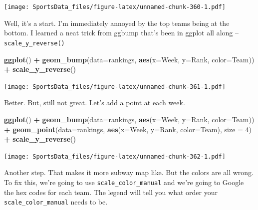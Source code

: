 \documentclass[
]{book}
\newenvironment{Shaded}{\begin{snugshade}}{\end{snugshade}}
\newcommand{\DataTypeTok}[1]{\textcolor[rgb]{0.13,0.29,0.53}{#1}}
\newcommand{\DecValTok}[1]{\textcolor[rgb]{0.00,0.00,0.81}{#1}}
\newcommand{\KeywordTok}[1]{\textcolor[rgb]{0.13,0.29,0.53}{\textbf{#1}}}
\newcommand{\NormalTok}[1]{#1}
\newcommand{\OperatorTok}[1]{\textcolor[rgb]{0.81,0.36,0.00}{\textbf{#1}}}
\newcommand{\StringTok}[1]{\textcolor[rgb]{0.31,0.60,0.02}{#1}}
\begin{document}
\texttt{[image: SportsData\_files/figure-latex/unnamed-chunk-360-1.pdf]}

Well, it's a start. I'm immediately annoyed by the top teams being at the bottom. I learned a neat trick from ggbump that's been in ggplot all along -- \texttt{scale\_y\_reverse()}

\begin{Shaded}
\begin{Highlighting}[]
\KeywordTok{ggplot}\NormalTok{() }\OperatorTok{+}\StringTok{ }\KeywordTok{geom_bump}\NormalTok{(}\DataTypeTok{data=}\NormalTok{rankings, }\KeywordTok{aes}\NormalTok{(}\DataTypeTok{x=}\NormalTok{Week, }\DataTypeTok{y=}\NormalTok{Rank, }\DataTypeTok{color=}\NormalTok{Team)) }\OperatorTok{+}\StringTok{ }\KeywordTok{scale_y_reverse}\NormalTok{()}
\end{Highlighting}
\end{Shaded}

\texttt{[image: SportsData\_files/figure-latex/unnamed-chunk-361-1.pdf]}

Better. But, still not great. Let's add a point at each week.

\begin{Shaded}
\begin{Highlighting}[]
\KeywordTok{ggplot}\NormalTok{() }\OperatorTok{+}\StringTok{ }
\StringTok{  }\KeywordTok{geom_bump}\NormalTok{(}\DataTypeTok{data=}\NormalTok{rankings, }\KeywordTok{aes}\NormalTok{(}\DataTypeTok{x=}\NormalTok{Week, }\DataTypeTok{y=}\NormalTok{Rank, }\DataTypeTok{color=}\NormalTok{Team)) }\OperatorTok{+}\StringTok{ }
\StringTok{  }\KeywordTok{geom_point}\NormalTok{(}\DataTypeTok{data=}\NormalTok{rankings, }\KeywordTok{aes}\NormalTok{(}\DataTypeTok{x=}\NormalTok{Week, }\DataTypeTok{y=}\NormalTok{Rank, }\DataTypeTok{color=}\NormalTok{Team), }\DataTypeTok{size =} \DecValTok{4}\NormalTok{) }\OperatorTok{+}
\StringTok{  }\KeywordTok{scale_y_reverse}\NormalTok{() }
\end{Highlighting}
\end{Shaded}

\texttt{[image: SportsData\_files/figure-latex/unnamed-chunk-362-1.pdf]}

Another step. That makes it more subway map like. But the colors are all wrong. To fix this, we're going to use \texttt{scale\_color\_manual} and we're going to Google the hex codes for each team. The legend will tell you what order your \texttt{scale\_color\_manual} needs to be.
\end{document}
